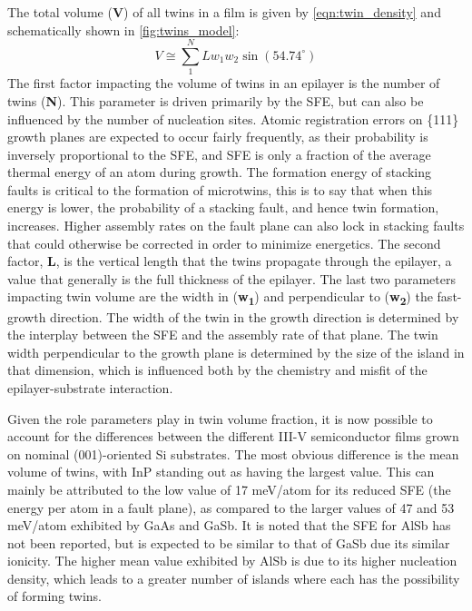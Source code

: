The total volume (\textbf{V}) of all twins in a film is given by \cref{eqn:twin_density} and schematically shown in \cref{fig:twins_model}:
\begin{equation}\label{eqn:twin_density}
 V \cong \sum\limits_{1}^{N} L w_1 w_2 \sin(54.74^{\circ})
\end{equation}
The first factor impacting the volume of twins in an epilayer is the number of twins (\textbf{N}).
This parameter is driven primarily by the SFE, but can also be influenced by the number of nucleation sites.
Atomic registration errors on \{111\} growth planes are expected to occur fairly frequently, as their probability is inversely proportional to the SFE, and SFE is only a fraction of the average thermal energy of an atom during growth\cite{Ernst1989}.
The formation energy of stacking faults is critical to the formation of microtwins, this is to say that when this energy is lower, the probability of a stacking fault, and hence twin formation, increases\cite{Oda2007}.
Higher assembly rates on the fault plane can also lock in stacking faults that could otherwise be corrected in order to minimize energetics.
The second factor, \textbf{L}, is the vertical length that the twins propagate through the epilayer, a value that generally is the full thickness of the epilayer.
The last two parameters impacting twin volume are the width in (\textbf{w\textsubscript{1}}) and perpendicular to (\textbf{w\textsubscript{2}}) the fast-growth direction.
The width of the twin in the growth direction is determined by the interplay between the SFE and the assembly rate of that plane.
The twin width perpendicular to the growth plane is determined by the size of the island in that dimension, which is influenced both by the chemistry and misfit of the epilayer-substrate interaction.

Given the role parameters play in twin volume fraction, it is now possible to account for the differences between the different III-V semiconductor films grown on nominal (001)-oriented Si substrates.
The most obvious difference is the mean volume of twins, with InP standing out as having the largest value.
This can mainly be attributed to the low value of 17 meV/atom for its reduced SFE (the energy per atom in a fault plane)\cite{Gottschalk1978}, as compared to the larger values of 47 and 53 meV/atom exhibited by GaAs and GaSb\cite{Gottschalk1978}.
It is noted that the SFE for AlSb has not been reported, but is expected to be similar to that of GaSb due its similar ionicity\cite{Holt2007b}.
The higher mean value exhibited by AlSb is due to its higher nucleation density\cite{Akahane2004}, which leads to a greater number of islands where each has the possibility of forming twins.

